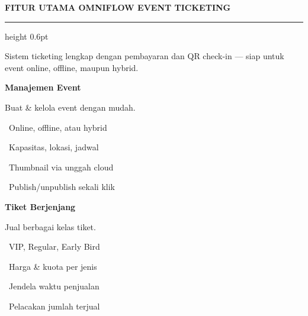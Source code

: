 \documentclass[a4paper]{article}
\newcommand{\sectiontitle}[1]{%
    \vspace{10pt}%
    {\fontsize{13}{16}\selectfont\bfseries\color{BlueDark} #1}\par\vspace{3pt}%
    {\color{BluePrimary}\hrule height 0.6pt}\par\vspace{8pt}%
}
\begin{document}
\sectiontitle{FITUR UTAMA OMNIFLOW EVENT TICKETING}

{\fontsize{9.5}{13}\selectfont\color{TextLight} Sistem ticketing lengkap dengan pembayaran dan QR check-in --- siap untuk event online, offline, maupun hybrid.}

\vspace{6pt}

\noindent
\begin{minipage}[t]{0.485\textwidth}
    \colorbox{BluePrimary}{%
        \begin{minipage}{\dimexpr\textwidth-2\fboxsep\relax}
            {\fontsize{10}{13}\selectfont\bfseries\color{White} Manajemen Event}
        \end{minipage}}\par
    \vspace{4pt}
    {\fontsize{9}{12}\selectfont\color{TextDark}%
    Buat \& kelola event dengan mudah.\par\vspace{3pt}
    \textbullet\ Online, offline, atau hybrid\par\vspace{2pt}%
    \textbullet\ Kapasitas, lokasi, jadwal\par\vspace{2pt}%
    \textbullet\ Thumbnail via unggah cloud\par\vspace{2pt}%
    \textbullet\ Publish/unpublish sekali klik}%

\end{minipage}%
\hfill
\begin{minipage}[t]{0.485\textwidth}
    \colorbox{EmeraldPrimary}{%
        \begin{minipage}{\dimexpr\textwidth-2\fboxsep\relax}
            {\fontsize{10}{13}\selectfont\bfseries\color{White} Tiket Berjenjang}
        \end{minipage}}\par
    \vspace{4pt}
    {\fontsize{9}{12}\selectfont\color{TextDark}%
    Jual berbagai kelas tiket.\par\vspace{3pt}
    \textbullet\ VIP, Regular, Early Bird\par\vspace{2pt}%
    \textbullet\ Harga \& kuota per jenis\par\vspace{2pt}%
    \textbullet\ Jendela waktu penjualan\par\vspace{2pt}%
    \textbullet\ Pelacakan jumlah terjual}%

\end{minipage}
\end{document}

